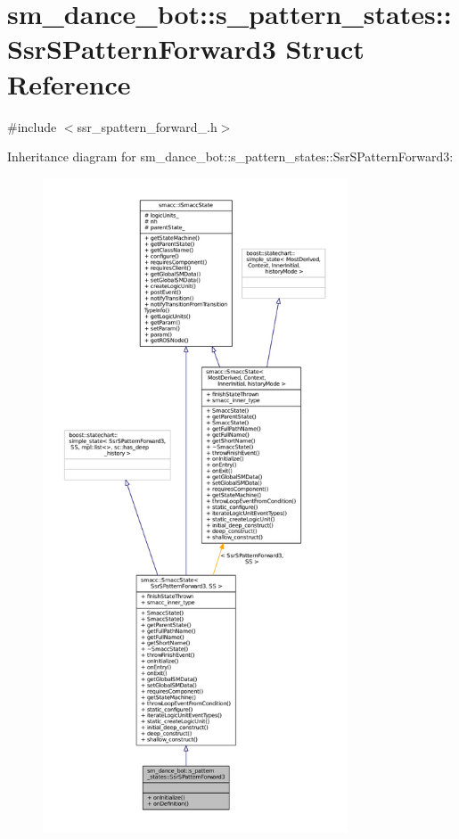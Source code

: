 \hypertarget{structsm__dance__bot_1_1s__pattern__states_1_1SsrSPatternForward3}{}\section{sm\+\_\+dance\+\_\+bot\+:\+:s\+\_\+pattern\+\_\+states\+:\+:Ssr\+S\+Pattern\+Forward3 Struct Reference}
\label{structsm__dance__bot_1_1s__pattern__states_1_1SsrSPatternForward3}


{\ttfamily \#include $<$ssr\+\_\+spattern\+\_\+forward\+\_.\+h$>$}



Inheritance diagram for sm\+\_\+dance\+\_\+bot\+:\+:s\+\_\+pattern\+\_\+states\+:\+:Ssr\+S\+Pattern\+Forward3\+:
\nopagebreak
\begin{figure}[H]
\begin{center}
\leavevmode
\includegraphics[height=550pt]{structsm__dance__bot_1_1s__pattern__states_1_1SsrSPatternForward3__inherit__graph}
\end{center}
\end{figure}


